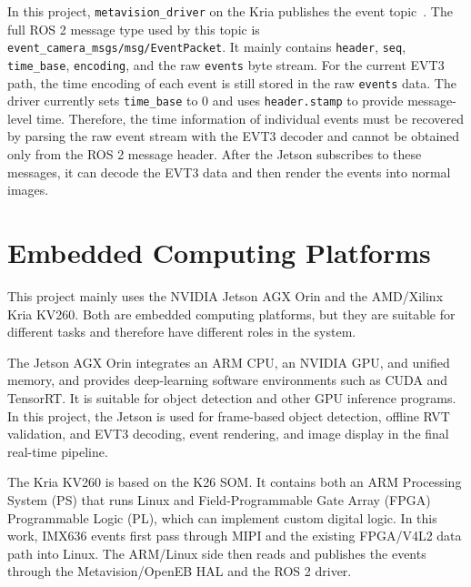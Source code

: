 In this project, \texttt{metavision\_driver} on the Kria publishes the event topic~\parencite{metavisionDriver}. The full ROS 2 message type used by this topic is \texttt{event\_camera\_msgs/msg/EventPacket}. It mainly contains \texttt{header}, \texttt{seq}, \texttt{time\_base}, \texttt{encoding}, and the raw \texttt{events} byte stream. For the current EVT3 path, the time encoding of each event is still stored in the raw \texttt{events} data. The driver currently sets \texttt{time\_base} to 0 and uses \texttt{header.stamp} to provide message-level time. Therefore, the time information of individual events must be recovered by parsing the raw event stream with the EVT3 decoder and cannot be obtained only from the ROS 2 message header. After the Jetson subscribes to these messages, it can decode the EVT3 data and then render the events into normal images.

\section{Embedded Computing Platforms}

This project mainly uses the NVIDIA Jetson AGX Orin and the AMD/Xilinx Kria KV260. Both are embedded computing platforms, but they are suitable for different tasks and therefore have different roles in the system.

The Jetson AGX Orin integrates an ARM CPU, an NVIDIA GPU, and unified memory, and provides deep-learning software environments such as CUDA and TensorRT. It is suitable for object detection and other GPU inference programs. In this project, the Jetson is used for frame-based object detection, offline RVT validation, and EVT3 decoding, event rendering, and image display in the final real-time pipeline.

The Kria KV260 is based on the K26 SOM. It contains both an ARM Processing System (PS) that runs Linux and Field-Programmable Gate Array (FPGA) Programmable Logic (PL), which can implement custom digital logic. In this work, IMX636 events first pass through MIPI and the existing FPGA/V4L2 data path into Linux. The ARM/Linux side then reads and publishes the events through the Metavision/OpenEB HAL and the ROS 2 driver.
